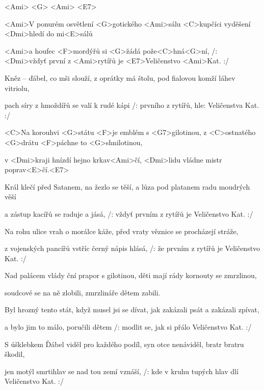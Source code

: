 

<Ami>	<G>	<Ami>	<E7>

\zs
<Ami>V ponurém osvětlení <G>gotického <Ami>sálu
<C>kupčíci vyděšení <Dmi>hledí do mi<E>sálů

<Ami>a houfec <F>mordýřů si <G>žádá pože<C>hná<G>ní,
/: <Dmi>vždyť první z <Ami>rytířů je <E7>Veličenstvo <Ami>Kat. :/
\ks

\zs
Kněz -- ďábel, co mši slouží, z oprátky má štolu,
pod fialovou komží láhev vitriolu,

pach síry z hmoždířů se valí k rudé kápi
/: prvního z rytířů, hle: Veličenstva Kat. :/
\ks

\zr
<C>Na korouhvi <G>státu <F>je emblém s <G7>gilotinou,
z <C>ostnatého <G>drátu <F>páchne to <G>shnilotinou,

v <Dmi>kraji hnízdí hejno krkav<Ami>čí,
<Dmi>lidu vládne mistr poprav<E>čí.<E7>
\kr

\zs
Král klečí před Satanem, na žezlo se těší,
a lůza pod platanem radu moudrých věší

a zástup kacířů se raduje a jásá,
/: vždyť prvním z rytířů je Veličenstvo Kat. :/
\ks

\zs
Na rohu ulice vrah o morálce káže,
před vraty věznice se procházejí stráže,

z vojenských pancířů vstříc černý nápis hlásá,
/: že prvním z rytířů je Veličenstvo Kat. :/
\ks

\zr
Nad palácem vlády ční prapor s gilotinou,
děti mají rády kornouty se zmrzlinou,

soudcové se na ně zlobili,
zmrzlináře dětem zabili.
\kr

\zs
Byl hrozný tento stát, když musel jsi se dívat,
jak zakázali psát a zakázali zpívat,

a bylo jim to málo, poručili dětem
/: modlit se, jak si přálo Veličenstvo Kat. :/
\ks

\zs
S úšklebkem Ďábel viděl pro každého podíl,
syn otce nenáviděl, bratr bratru škodil,

jen motýl smrtihlav se nad tou zemí vznáší,
/: kde v kruhu tupých hlav dlí Veličenstvo Kat. :/
\ks

\kp
